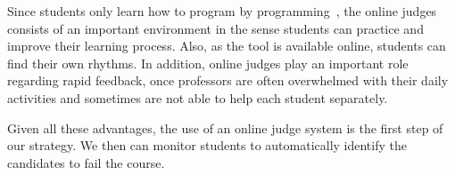 Since students only learn how to program by programming~\cite{jenkins-ltsn02}, the online judges consists of an important environment in the sense students can practice and improve their learning process. Also, as the tool is available online, students can find their own rhythms. In addition, online judges play an important role regarding rapid feedback, once professors are often overwhelmed with their daily activities and sometimes are not able to help each student separately.

Given all these advantages, the use of an online judge system is the first step of our strategy. We then can monitor students to automatically identify the candidates to fail the course.




